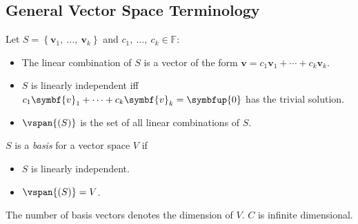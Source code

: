 \documentclass{article}
\begin{document}
\begin{multicols*}{3}
    \subsection{General Vector Space Terminology}
    Let \(S = \left\{ \symbf{v}_1,\: \dots,\: \symbf{v}_k \right\}\)
    and \(c_1,\: \dots,\: c_k \in \mathbb{F}\):
    \begin{itemize}
        \item The linear combination of \(S\) is a vector of the form
              \(\symbf{v} = c_1 \symbf{v}_1 + \cdots + c_k
              \symbf{v}_k\).
        \item \(S\) is linearly independent iff
              \(c_1 \symbf{v}_1 + \cdots + c_k \symbf{v}_k = \symbfup{0}\) has the trivial solution.
        \item \(\vspan{\left( S \right)}\) is the set of all linear combinations of \(S\).
    \end{itemize}
    \(S\) is a \textit{basis} for a vector space \(V\) if
    \begin{itemize}
        \item \(S\) is linearly independent.
        \item \(\vspan{\left( S \right)} = V\).
    \end{itemize}
    The number of basis vectors denotes the dimension of \(V\).
    \(C\) is infinite dimensional.

\end{multicols*}
\end{document}
